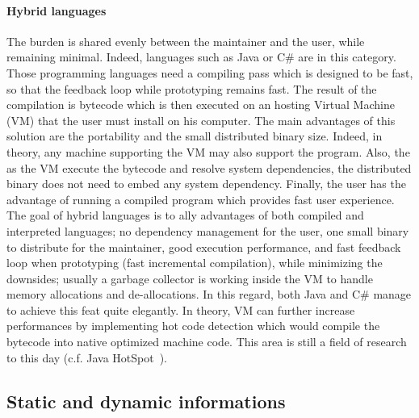 \paragraph{Hybrid languages} The burden is shared evenly between the maintainer and the user, while remaining minimal.
Indeed, languages such as Java or C\# are in this category. Those programming languages need a compiling pass which is
designed to be fast, so that the feedback loop while prototyping remains fast. The result of the compilation is bytecode
which is then executed on an hosting Virtual Machine (VM) that the user must install on his computer. The main
advantages of this solution are the portability and the small distributed binary size. Indeed, in theory, any machine
supporting the VM may also support the program. Also, the as the VM execute the bytecode and resolve system
dependencies, the distributed binary does not need to embed any system dependency. Finally, the user has the advantage
of running a compiled program which provides fast user experience. The goal of hybrid languages is to ally advantages of
both compiled and interpreted languages; no dependency management for the user, one small binary to distribute for the
maintainer, good execution performance, and fast feedback loop when prototyping (fast incremental compilation), while
minimizing the downsides; usually a garbage collector is working inside the VM to handle memory allocations and
de-allocations. In this regard, both Java and C\# manage to achieve this feat quite elegantly. In theory, VM can further
increase performances by implementing hot code detection which would compile the bytecode into native optimized machine
code. This area is still a field of research to this day (c.f. Java
HotSpot~\parencite{xie.improving,kotzmann.2008.hotspot,halli.2016.java-hpc}).


\subsection{Static and dynamic informations}

